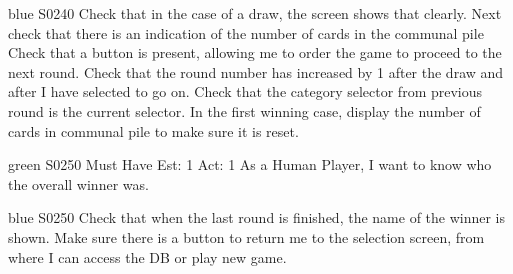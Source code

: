 \begin{card}{blue}
{S0240}{}{}{}
Check that in the case of a draw, the screen shows that clearly. 
Next check that there is an indication of the number of cards in the communal pile Check that a button is present, allowing me to order the game to proceed to the next round. 
Check that the round number has increased by 1 after the draw and after I have selected to go on. 
Check that the category selector from previous round is the current selector. 
In the first winning case, display the number of cards in communal pile to make sure it is reset.
\end{card}


\newpage

\begin{card}{green}
{S0250}
{Must Have}
{Est: 1}
{Act: 1}
As a Human Player, I want to know who the overall winner was.
\end{card}

\begin{card}{blue}
{S0250}{}{}{}
Check that when the last round is finished, the name of the winner is shown. Make sure there is a button to return me to the selection screen, from where I can access the DB or play new game.
\end{card}


